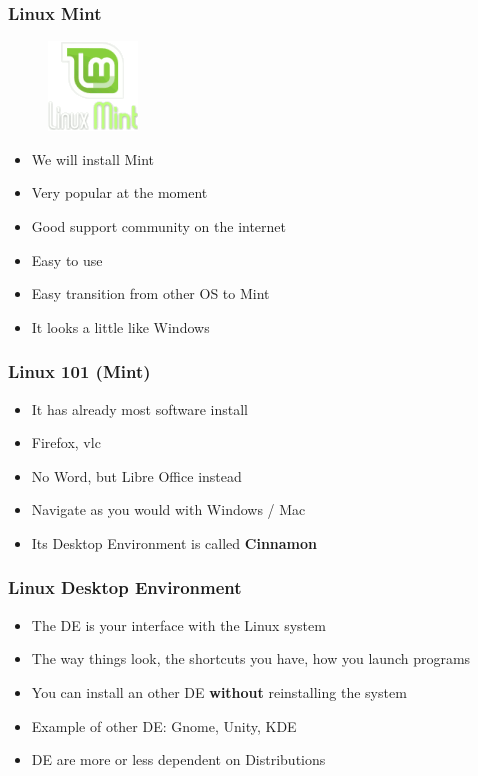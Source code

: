 \documentclass{beamer}
\begin{document}
\begin{frame}
\frametitle{Linux Mint}
\begin{figure}
\begin{center}
\includegraphics[scale=0.5]{mint.png}\\%
\end{center}
\end{figure}
\begin{itemize}
\item We will install Mint 
\item Very popular at the moment
\item Good support community on the internet
\item Easy to use
\item Easy transition from other OS to Mint
\item It looks a little like Windows
\end{itemize}
\end{frame}

\begin{frame}
\frametitle{Linux 101 (Mint)}
\begin{itemize}
\item It has already most software install
\item Firefox, vlc 
\item No Word, but Libre Office instead
\item Navigate as you would with Windows / Mac
\item Its Desktop Environment is called \textbf{Cinnamon}
\end{itemize}
\end{frame}


\begin{frame}
\frametitle{Linux Desktop Environment}
\begin{itemize}
\item The DE is your interface with the Linux system
\item The way things look, the shortcuts you have, how you launch programs
\item You can install an other DE \textbf{without} reinstalling the system
\item Example of other DE: Gnome, Unity, KDE
\item DE are more or less dependent on Distributions
\end{itemize}
\end{frame}
\end{document}
